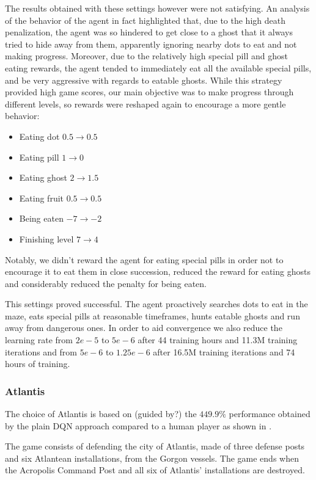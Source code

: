 \documentclass[10pt,twocolumn,letterpaper]{article}
\begin{document}
The results obtained with these settings however were not satisfying. An analysis of the behavior of the agent in fact highlighted that, due to the high death penalization, the agent was so hindered to get close to a ghost that it always tried to hide away from them, apparently ignoring nearby dots to eat and not making progress. Moreover, due to the relatively high special pill and ghost eating rewards, the agent tended to immediately eat all the available special pills, and be very aggressive with regards to eatable ghosts. While this strategy provided high game scores, our main objective was to make progress through different levels, so rewards were reshaped again to encourage a more gentle behavior:
\begin{itemize}
	\item Eating dot $0.5 \rightarrow 0.5$
	\item Eating pill $1 \rightarrow 0$
	\item Eating ghost $2 \rightarrow 1.5$
	\item Eating fruit $0.5 \rightarrow 0.5$
	\item Being eaten $-7 \rightarrow -2$
	\item Finishing level $7 \rightarrow 4$
\end{itemize}

Notably, we didn't reward the agent for eating special pills in order not to encourage it to eat them in close succession, reduced the reward for eating ghosts and considerably reduced the penalty for being eaten.

This settings proved successful. The agent proactively searches dots to eat in the maze, eats special pills at reasonable timeframes, hunts eatable ghosts and run away from dangerous ones.
In order to aid convergence we also reduce the learning rate from $2e-5$ to $5e-6$ after 44 training hours and 11.3M training iterations and from $5e-6$ to $1.25e-6$ after 16.5M training iterations and 74 hours of training.

\subsubsection{Atlantis}
\label{atlantis}
The choice of Atlantis is based on (guided by?) the $449.9\%$ performance obtained by the plain DQN approach compared to a human player as shown in \cite{humancontrol}.
 
The game consists of defending the city of Atlantis, made of three defense posts and six Atlantean installations, from the Gorgon vessels. The game ends when the Acropolis Command Post and all six of Atlantis' installations are destroyed. 
\end{document}
